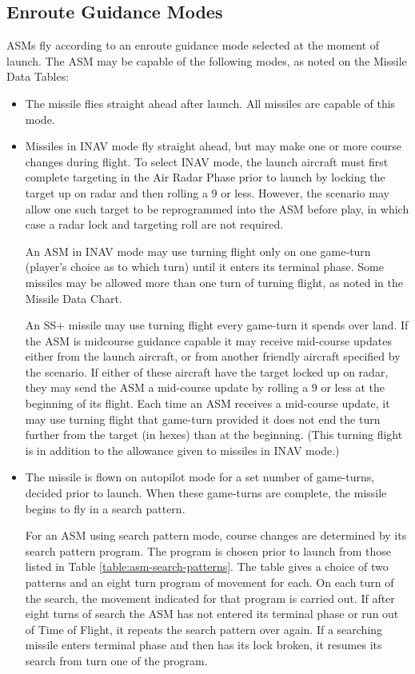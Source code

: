 \begin{advancedrules}
    \subsection{Enroute Guidance Modes}  ASMs fly according to an enroute guidance mode selected at the moment of launch.  The ASM may be capable of the following modes, as noted on the Missile Data Tables:
    \begin{itemize}

        \item {} The missile flies straight ahead after launch.  All missiles are capable of this mode.

        \item {} Missiles in INAV mode fly straight ahead, but may make one or more course changes during flight. To select INAV mode, the launch aircraft must first complete targeting in the Air Radar Phase prior to launch by locking the target up on radar and then rolling a 9 or less. However, the scenario may allow one such target to be reprogrammed into the ASM before play, in which case a radar lock and targeting roll are not required.

            An ASM in INAV mode may use turning flight only on one game-turn (player's choice as to which turn) until it enters its terminal phase. Some missiles may be allowed more than one turn of turning flight, as noted in the Missile Data Chart.

            An SS+ missile may use turning flight every game-turn it spends over land.  If the ASM is midcourse guidance capable it may receive mid-course updates either from the launch aircraft, or from another friendly aircraft specified by the scenario.  If either of these aircraft have the target locked up on radar, they may send the ASM a mid-course update by rolling a 9 or less at the beginning of its flight.  Each time an ASM receives a mid-course update, it may use turning flight that game-turn provided it does not end the turn further from the target (in hexes) than at the beginning. (This turning flight is in addition to the allowance given to missiles in INAV mode.)

        \item {}  The missile is flown on autopilot mode for a set number of game-turns, decided prior to launch.  When these game-turns are complete, the missile begins to fly in a search pattern.

            For an ASM using search pattern mode, course changes are determined by its search pattern program.  The program is chosen prior to launch from those listed in Table \ref{table:asm-search-patterns}. The table gives a choice of two patterns and an eight turn program of movement for each. On each turn of the search, the movement indicated for that program is carried out.  If after eight turns of search the ASM has not entered its terminal phase or run out of Time of Flight, it repeats the search pattern over again.  If a searching missile enters terminal phase and then has its lock broken, it resumes its search from turn one of the program.


\end{itemize}
\end{advancedrules}
